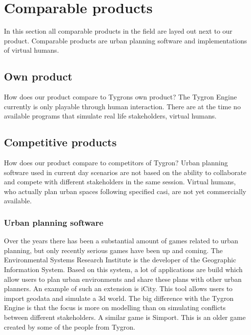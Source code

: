 \section{Comparable products}
In this section all comparable products in the field are layed out next to our product. Comparable products are urban planning software and implementations of virtual humans.  \newline

\subsection{Own product}
How does our product compare to Tygrons own product?
The Tygron Engine currently is only playable through human interaction. There are at the time no available programs that simulate real life stakeholders, virtual humans. \newline

\subsection{Competitive products}
How does our product compare to competitors of Tygron?
Urban planning software used in current day scenarios are not based on the ability to collaborate and compete with different stakeholders in the same session. Virtual humans, who actually plan urban spaces following specified casi, are not yet commercially available. \newline

\subsubsection{Urban planning software}
Over the years there has been a substantial amount of games related to urban planning\cite{Poplin11}, but only recently serious games have been up and coming. The Environmental Systems Research Institute is the developer of the Geographic Information System\cite{GIS06}. Based on this system, a lot of applications are build which allow users to plan urban environments and share these plans with other urban planners. An example of such an extension is iCity\cite{Steve07}. This tool allows users to import geodata and simulate a 3d world. The big difference with the Tygron Engine is that the focus is more on modelling than on simulating conflicts between different stakeholders. A similar game is Simport\cite{Warm06}. This is an older game created by some of the people from Tygron. \newline


